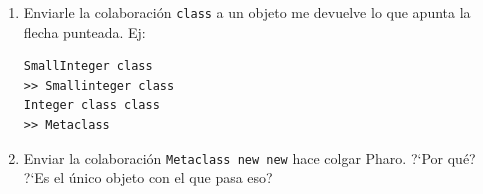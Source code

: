 \begin{enumerate}
 \item Enviarle la colaboraci\'on \texttt{class} a un objeto me devuelve lo que apunta la flecha punteada. Ej: 
\begin{verbatim}
SmallInteger class
>> Smallinteger class
Integer class class
>> Metaclass
\end{verbatim}
  
 \item Enviar la colaboraci\'on \texttt{Metaclass new new} hace colgar Pharo. ?`Por qu\'e? ?`Es el \'unico objeto con el que pasa eso? 

\end{enumerate}